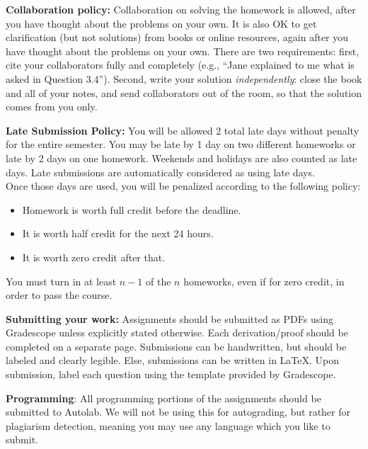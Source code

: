 \documentclass{article}
\begin{document}
\begin{itemize*}

\item \textbf{Collaboration policy:} Collaboration on solving the homework is allowed, after you have thought about the problems on your own.  It is also OK to get clarification (but not solutions) from books or online resources, again after you have thought about the problems on your own.  There are two requirements: first, cite your collaborators fully and completely (e.g., ``Jane explained to me what is asked in Question 3.4'').  Second, write your solution {\em independently}: close the book and all of your notes, and send collaborators out of the room, so that the solution comes from you only.

\item\textbf{Late Submission Policy:} You will be allowed 2 total late days without penalty for the entire semester. You may be late by 1 day on two different homeworks or late by 2 days on one homework. Weekends and holidays are also counted as late days. Late submissions are automatically considered as using late days.
\\Once those days are used, you will be penalized according to the following policy:
\begin{itemize}
\item Homework is worth full credit before the deadline.
\item It is worth half credit for the next 24 hours.
\item It is worth zero credit after that.
\end{itemize}
You must turn in at least $n-1$ of the $n$ homeworks, even if for zero credit, in order to pass the course.


\item\textbf{Submitting your work:} Assignments should be submitted as PDFs using Gradescope unless explicitly stated otherwise.  Each derivation/proof should be completed on a separate page. Submissions can be handwritten, but should be labeled and clearly legible.  Else, submissions can be written in LaTeX.  Upon submission, label each question using the template provided by Gradescope.  

 \item \textbf{Programming}: All programming portions of the assignments should be submitted to Autolab.  We will not be using this for autograding, but rather for plagiarism detection, meaning you may use any language which you like to submit.
\end{itemize*}

\newpage






\end{document}
